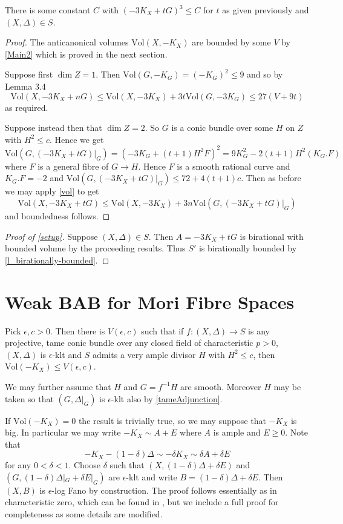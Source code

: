 \documentclass[a4paper,12pt]{book}
\newcommand{\Vol}{\text{Vol}}
\begin{document}
\begin{lemma}
	There is some constant $C$ with $(-3K_{X}+tG)^{3} \leq C$ for $t$ as given previously and $(X,\Delta)\in S$.
\end{lemma}

\begin{proof}
	The anticanonical volumes $\Vol(X,-K_{X})$ are bounded by some $V$ by \autoref{Main2} which is proved in the next section.
	
	Suppose first $\dim Z=1$. Then $\Vol(G,-K_{G})=(-K_{G})^{2} \leq 9$ and so by Lemma 3.4
	\[\Vol(X,-3K_{X}+nG) \leq \Vol(X,-3K_{X}) + 3t\Vol(G,-3K_{G})\leq 27(V+9t)\]
	as required.

	Suppose instead then that $\dim Z=2$. So $G$ is a conic bundle over some $H$ on $Z$ with $H^{2} \leq c$. Hence we get
	\[\Vol(G,(-3K_{X}+tG)|_{G})= (-3K_{G}+(t+1)H^{2}F)^{2}=9K_{G}^{2}-2(t+1)H^{2}(K_{G}.F)\]
	where $F$ is a general fibre of $G \to H$. Hence $F$ is a smooth rational curve and $K_{G}.F=-2$ and $\Vol(G,(-3K_{X}+tG)|_{G})\leq 72+4(t+1)c$. Then as before we may apply \autoref{vol} to get 
	\[\Vol(X,-3K_{X}+tG) \leq \Vol(X,-3K_{X}) + 3n\Vol(G,(-3K_{X}+tG)|_{G})\]
	and boundedness follows.
\end{proof}

\begin{proof}[Proof of \autoref{setup}]
	Suppose $(X,\Delta) \in S$. Then $A=-3K_{X}+tG$ is birational with bounded volume by the proceeding results. Thus $S'$ is birationally bounded by \autoref{l_birationally-bounded}.
	\end{proof}

\section{Weak BAB for Mori Fibre Spaces}
	\begin{theorem}\label{J1}
	Pick $\epsilon,c >0$. Then there is $V(\epsilon,c)$ such that if $f\colon (X,\Delta) \to S$ is any projective, tame conic bundle over any closed field of characteristic $p> 0$, $(X,\Delta)$ is $\epsilon$-klt and $S$ admits a very ample divisor $H$ with $H^{2} \leq c$, then $\Vol(-K_{X}) \leq V(\epsilon,c)$. 
\end{theorem}

We may further assume that $H$ and $G=f^{-1}H$ are smooth. Moreover $H$ may be taken so that $(G,\Delta|_{G})$ is $\epsilon$-klt also by \autoref{tameAdjunction}.

If $\Vol(-K_{X})=0$ the result is trivially true, so we may suppose that $-K_{X}$ is big. In particular we may write $-K_{X}\sim A+E$ where $A$ is ample and $E \geq 0$. Note that $$-K_{X}-(1-\delta)\Delta\sim -\delta K_{X} \sim \delta A + \delta E$$ for any $0 < \delta <1$. Choose $\delta$ such that $(X,(1-\delta)\Delta+\delta E)$ and $(G,(1-\delta)\Delta|_{G}+\delta E|_{G})$ are $\epsilon$-klt and write $B=(1-\delta)\Delta+\delta E$. Then $(X,B)$ is $\epsilon$-log Fano by construction. The proof follows essentially as in characteristic zero, which can be found in \cite{jiang2014boundedness}, but we include a full proof for completeness as some details are modified.
\end{document}
